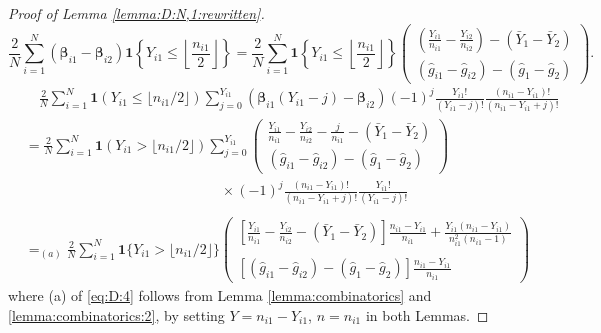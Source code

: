 \documentclass[12pt,letterpaper]{article}
\begin{document}
\begin{proof}[Proof of Lemma \ref{lemma:D:N,1:rewritten}]
\begin{equation}\label{eq:D:3}
    \frac{2}{N}\sum_{i=1}^N(\boldsymbol{\beta}_{i1}-\boldsymbol{\beta}_{i2})\mathbf{1}\left\{Y_{i1}\leq \left\lfloor \frac{n_{i1}}{2}\right\rfloor\right\}=\frac{2}{N}\sum_{i=1}^N\mathbf{1}\left\{Y_{i1}\leq\left\lfloor \frac{n_{i1}}{2}\right\rfloor\right\}\begin{pmatrix}
\displaystyle\left(\frac{Y_{i1}}{n_{i1}}-\frac{Y_{i2}}{n_{i2}}\right)-(\bar{Y}_1-\bar{Y}_2)\\
\displaystyle(\hat{g}_{i1}-\hat{g}_{i2})-(\hat{g}_1-\hat{g}_2)
\end{pmatrix}.
\end{equation}
\begin{equation}\label{eq:D:4}
\begin{array}{rl}
&\quad\displaystyle\frac{2}{N}\sum_{i=1}^N\mathbf{1}(Y_{i1}\leq \lfloor n_{i1}/2\rfloor)\sum_{j=0}^{Y_{i1}}(\boldsymbol{\beta}_{i1}(Y_{i1}-j)-\boldsymbol{\beta}_{i2})(-1)^{j}\frac{Y_{i1}!}{(Y_{i1}-j)!}\frac{(n_{i1}-Y_{i1})!}{(n_{i1}-Y_{i1}+j)!}\\
&\displaystyle=\frac{2}{N}\sum_{i=1}^N\mathbf{1}(Y_{i1} > \lfloor n_{i1}/2\rfloor)\sum_{j=0}^{Y_{i1}}\begin{pmatrix}
\displaystyle\frac{Y_{i1}}{n_{i1}}-\frac{Y_{i2}}{n_{i2}}-\frac{j}{n_{i1}}-(\bar{Y}_1-\bar{Y}_2)\\
\displaystyle(\hat{g}_{i1}-\hat{g}_{i2})-(\hat{g}_1-\hat{g}_2)
\end{pmatrix}\\
&\quad\quad\quad\quad\quad\quad\quad\quad\quad\quad\quad\quad\quad\quad\displaystyle\times(-1)^{j}\frac{(n_{i1}-Y_{i1})!}{(n_{i1}-Y_{i1}+j)!}\frac{Y_{i1}!}{(Y_{i1}-j)!}\\
\\
&\displaystyle=_{(a)}\frac{2}{N}\sum_{i=1}^N\mathbf{1}\{Y_{i1} > \lfloor n_{i1}/2\rfloor\}\begin{pmatrix}
\displaystyle\left[\frac{Y_{i1}}{n_{i1}}-\frac{Y_{i2}}{n_{i2}}-(\bar{Y}_1-\bar{Y}_2)\right]\frac{n_{i1}-Y_{i1}}{n_{i1}}+\frac{Y_{i1}(n_{i1}-Y_{i1})}{n_{i1}^2(n_{i1}-1)}\\
\\
\displaystyle\left[(\hat{g}_{i1}-\hat{g}_{i2})-(\hat{g}_1-\hat{g}_2)\right]\frac{n_{i1}-Y_{i1}}{n_{i1}}
\end{pmatrix}
\end{array}
\end{equation}
where (a) of \eqref{eq:D:4} follows from Lemma \ref{lemma:combinatorics} and \ref{lemma:combinatorics:2}, by setting $Y=n_{i1}-Y_{i1}$, $n=n_{i1}$ in both Lemmas.

\end{proof}
\end{document}
